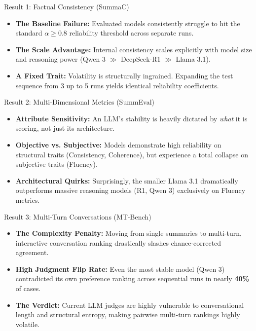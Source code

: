 \documentclass[10pt]{beamer}
\begin{document}
\begin{frame}{Result 1: Factual Consistency (SummaC)}
  \begin{itemize}
    \item \textbf{The Baseline Failure:} Evaluated models consistently struggle to hit the standard $\alpha \ge 0.8$ reliability threshold across separate runs.
    \item \textbf{The Scale Advantage:} Internal consistency scales explicitly with model size and reasoning power (Qwen 3 $\gg$ DeepSeek-R1 $\gg$ Llama 3.1).
    \item \textbf{A Fixed Trait:} Volatility is structurally ingrained. Expanding the test sequence from 3 up to 5 runs yields identical reliability coefficients.
  \end{itemize}
\end{frame}

\begin{frame}{Result 2: Multi-Dimensional Metrics (SummEval)}
  \begin{itemize}
    \item \textbf{Attribute Sensitivity:} An LLM's stability is heavily dictated by \textit{what} it is scoring, not just its architecture.
    \item \textbf{Objective vs. Subjective:} Models demonstrate high reliability on structural traits (Consistency, Coherence), but experience a total collapse on subjective traits (Fluency).
    \item \textbf{Architectural Quirks:} Surprisingly, the smaller Llama 3.1 dramatically outperforms massive reasoning models (R1, Qwen 3) exclusively on Fluency metrics.
  \end{itemize}
\end{frame}

\begin{frame}{Result 3: Multi-Turn Conversations (MT-Bench)}
  \begin{itemize}
    \item \textbf{The Complexity Penalty:} Moving from single summaries to multi-turn, interactive conversation ranking drastically slashes chance-corrected agreement.
    \item \textbf{High Judgment Flip Rate:} Even the most stable model (Qwen 3) contradicted its own preference ranking across sequential runs in nearly \textbf{40\%} of cases.
    \item \textbf{The Verdict:} Current LLM judges are highly vulnerable to conversational length and structural entropy, making pairwise multi-turn rankings highly volatile.
  \end{itemize}
\end{frame}
\end{document}
